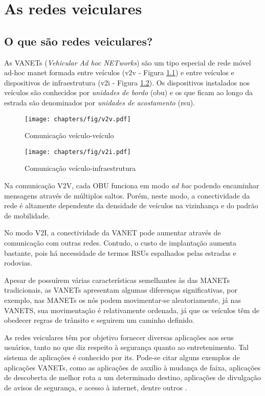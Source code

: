 \chapter{As redes veiculares}
\label{chapter:vanets}

\section{O que são redes veiculares?}
As VANETs (\textit{Vehicular Ad hoc NETworks}) são um tipo especial de rede
móvel ad-hoc \gls{manet} formada entre veículos (\gls{v2v} -
Figura \ref{fig:v2v}) e entre veículos e dispositivos de infraestrutura
(\gls{v2i} - Figura \ref{fig:v2i}). Os
dispositivos instalados nos veículos são conhecidos por \textit{unidades de
bordo} (\gls{obu}) e os que
ficam ao longo da estrada são denominados por \textit{unidades de acostamento}
(\gls{rsu}).

\begin{figure}[htbp]
\centering
 \texttt{[image: chapters/fig/v2v.pdf]}
\caption{Comunicação veículo-veículo}
\label{fig:v2v}
\end{figure}

\begin{figure}[htbp]
\centering
 \texttt{[image: chapters/fig/v2i.pdf]}
\caption{Comunicação veículo-infraestrutura}
\label{fig:v2i}
\end{figure}

Na comunicação V2V, cada OBU funciona em modo \textit{ad hoc} podendo encaminhar
mensagens através de múltiplos saltos. Porém, neste modo, a conectividade da
rede é altamente dependente da densidade de veículos na vizinhança e do padrão
de mobilidade.

No modo V2I, a conectividade da VANET pode aumentar através de comunicação com
outras redes. Contudo, o custo de implantação aumenta bastante, pois há
necessidade de termos RSUs espalhados pelas estradas e rodovias.

Apesar de possuírem várias características semelhantes às das MANETs
tradicionais, as VANETs apresentam algumas diferenças significativas, por
exemplo, nas MANETs os nós podem movimentar-se aleatoriamente, já nas VANETS,
sua movimentação é relativamente ordenada, já que os veículos têm de obedecer
regras de trânsito e seguirem um caminho definido.

As redes veiculares têm por objetivo fornecer diversas aplicações aos seus
usuários, tanto no que diz respeito à segurança quanto ao entretenimento. Tal
sistema de aplicações é conhecido por \gls{its}. Pode-se citar alguns exemplos de aplicações
VANETs, como as aplicações de auxílio à mudança de faixa, aplicações de
descoberta de melhor rota a um determinado destino, aplicações de divulgação de
avisos de segurança, e acesso à internet, dentre outros \cite{li2007routing}.

